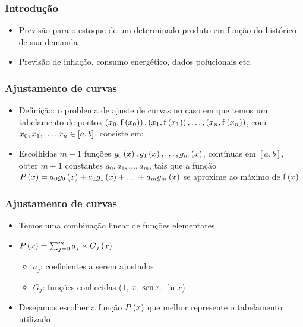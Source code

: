 \begin{frame}
\frametitle{Introdução}

\begin{itemize}[<+->]
  \item Previsão para o estoque de um determinado produto em função do histórico de sua demanda

  \item Previsão de inflação, consumo energético, dados polucionais etc.
\end{itemize}
\end{frame}

\begin{frame}
\frametitle{Ajustamento de curvas}

\begin{itemize}
  \item Definição: o problema de ajuste de curvas no caso em que temos um tabelamento de pontos $\left(x_0, \mathrm{f}\left(x_0\right)\right), \left(x_1, \mathrm{f}\left(x_1\right) \right), \ldots, \left(x_n, \mathrm{f}\left(x_n\right) \right) $, com $x_0, x_1, \ldots, x_n \in [a,b]$, consiste em:
  
  \item Escolhidas $m+1$ funções $g_0\left(x\right), g_1\left(x\right), \ldots, g_m\left(x\right) $, contínuas em $[a,b]$, obter $m+1$ constantes $a_0, a_1, \ldots, a_m$, tais que a função $P\left(x \right) = a_0 g_0\left(x\right) + a_1 g_1 \left(x\right) + \ldots + a_m g_m \left(x\right) $ se aproxime ao máximo de $\mathrm{f}\left(x\right) $
\end{itemize}
\end{frame}

\begin{frame}
\frametitle{Ajustamento de curvas}

\begin{itemize}
  \item Temos uma combinação linear de funções elementares
  \item $P\left(x\right) = \sum_{j=0}^m a_j \times G_j \left(x\right) $
    \begin{itemize}
      \item $a_j$: coeficientes a serem ajustados
      \item $G_j$: funções conhecidas ($1$, $x$, $\operatorname{\text{sen}} x$, $\ln x$)
    \end{itemize}
  \item Desejamos escolher a função $P\left(x\right)$ que melhor represente o tabelamento utilizado
\end{itemize}
\end{frame}

